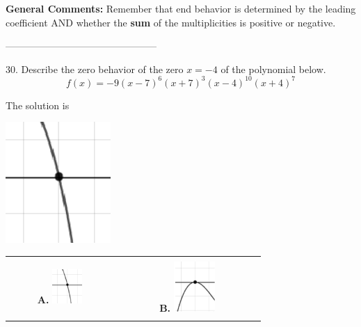 \documentclass{article}[14pt]
\begin{document}
\textbf{General Comments:} Remember that end behavior is determined by the leading coefficient AND whether the \textbf{sum} of the multiplicities is positive or negative.

-----------------------------------------------

30. Describe the zero behavior of the zero $x = -4$ of the polynomial below.
$$ f(x) = -9(x - 7)^{6}(x + 7)^{3}(x - 4)^{10}(x + 4)^{7} $$ 

 
 The solution is  
 \begin{center} \includegraphics[width=0.3\textwidth]{../Figures/zeroBehaviorNegativeOddC.png} \end{center}\begin{tabular}{|c|c|} 
\hline 
 & \tabularnewline 
 \textbf{A.} \includegraphics[width=0.3\textwidth]{../Figures/zeroBehaviorNegativeOddC.png} & \textbf{B.} \includegraphics[width=0.3\textwidth]{../Figures/zeroBehaviorNegativeEvenC.png} \tabularnewline 
\hline 
 & \tabularnewline 

\end{tabular}
\end{document}
